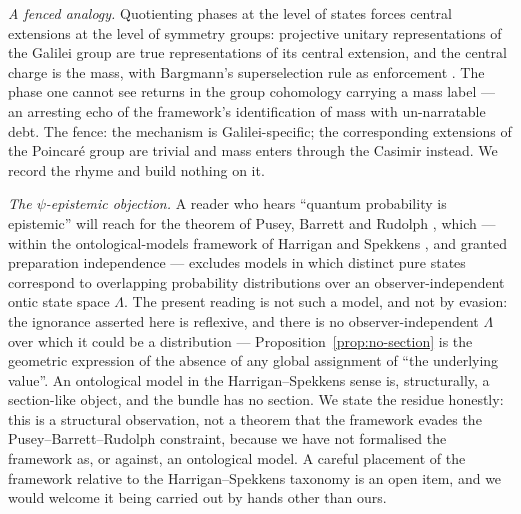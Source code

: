\emph{A fenced analogy.} Quotienting phases at the level of states
forces central extensions at the level of symmetry groups: projective
unitary representations of the Galilei group are true representations
of its central extension, and the central charge is the mass, with
Bargmann's superselection rule as enforcement
\autocite{bargmann1954unitary}. The phase one cannot see returns in
the group cohomology carrying a mass label --- an arresting echo of
the framework's identification of mass with un-narratable debt. The
fence: the mechanism is Galilei-specific; the corresponding extensions
of the Poincar\'e group are trivial and mass enters through the
Casimir instead. We record the rhyme and build nothing on it.

\emph{The $\psi$-epistemic objection.} A reader who hears ``quantum
probability is epistemic'' will reach for the theorem of Pusey,
Barrett and Rudolph \autocite{Pusey2012b}, which --- within the
ontological-models framework of Harrigan and Spekkens
\autocite{harrigan2010einstein}, and granted preparation independence
--- excludes models in which distinct pure states correspond to
overlapping probability distributions over an observer-independent
ontic state space $\Lambda$. The present reading is not such a model,
and not by evasion: the ignorance asserted here is reflexive, and
there is no observer-independent $\Lambda$ over which it could be a
distribution --- Proposition~\ref{prop:no-section} is the geometric
expression of the absence of any global assignment of ``the underlying
value''. An ontological model in the Harrigan--Spekkens sense is,
structurally, a section-like object, and the bundle has no section. We
state the residue honestly: this is a structural observation, not a
theorem that the framework evades the Pusey--Barrett--Rudolph
constraint, because we have not formalised the framework as, or
against, an ontological model. A careful placement of the framework
relative to the Harrigan--Spekkens taxonomy is an open item, and we
would welcome it being carried out by hands other than ours.

